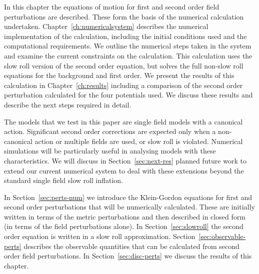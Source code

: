 In this chapter the equations of motion for first and second order field
perturbations are described. These form the basis of the numerical calculation
undertaken.
Chapter~\ref{ch:numericalsystem} describes the numerical implementation of the
calculation, including the initial conditions used and the
computational requirements. We outline the numerical steps
taken in the system and examine the current constraints
on the calculation. This calculation uses the slow roll version of the second
order equation, but solves the full non-slow roll equations for the
background and first order.
% 
We present the results of this calculation
in Chapter~\ref{ch:results} including a comparison of the second
order perturbation calculated for the four potentials used. We discuss
these results and describe the next steps required in detail.

%
% 
The models that we test in this paper are single field models with a canonical
action. Significant second order corrections
are expected only when a non-canonical action or multiple fields are
used, or slow roll is violated. Numerical simulations will be particularly
useful in analysing models with these characteristics.
We will discuss in
Section~\ref{sec:next-res} planned future work to extend our current numerical
system to deal with these extensions beyond the standard single field slow roll
inflation.


In Section~\ref{sec:perts-num} we introduce the Klein-Gordon equations
for first and second order
perturbations that will be numerically calculated. These are initially written in
terms of the metric perturbations and
then described in closed form (\ie in terms of the field perturbations alone). In
Section~\ref{sec:slowroll} the second order equation is written in a slow roll
approximation.
% 
Section~\ref{sec:observable-perts} describes the observable quantities that can be
calculated from second order field perturbations. In Section~\ref{sec:disc-perts} we
discuss the results of this chapter.




% 
% 
% 
% 
